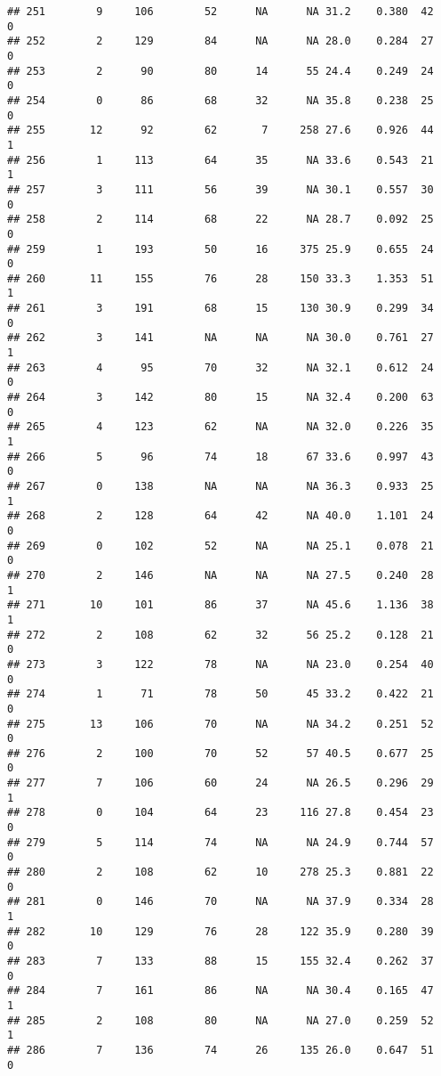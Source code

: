 \documentclass[
]{article}
\begin{document}
\begin{verbatim}
## 251        9     106        52      NA      NA 31.2    0.380  42    0
## 252        2     129        84      NA      NA 28.0    0.284  27    0
## 253        2      90        80      14      55 24.4    0.249  24    0
## 254        0      86        68      32      NA 35.8    0.238  25    0
## 255       12      92        62       7     258 27.6    0.926  44    1
## 256        1     113        64      35      NA 33.6    0.543  21    1
## 257        3     111        56      39      NA 30.1    0.557  30    0
## 258        2     114        68      22      NA 28.7    0.092  25    0
## 259        1     193        50      16     375 25.9    0.655  24    0
## 260       11     155        76      28     150 33.3    1.353  51    1
## 261        3     191        68      15     130 30.9    0.299  34    0
## 262        3     141        NA      NA      NA 30.0    0.761  27    1
## 263        4      95        70      32      NA 32.1    0.612  24    0
## 264        3     142        80      15      NA 32.4    0.200  63    0
## 265        4     123        62      NA      NA 32.0    0.226  35    1
## 266        5      96        74      18      67 33.6    0.997  43    0
## 267        0     138        NA      NA      NA 36.3    0.933  25    1
## 268        2     128        64      42      NA 40.0    1.101  24    0
## 269        0     102        52      NA      NA 25.1    0.078  21    0
## 270        2     146        NA      NA      NA 27.5    0.240  28    1
## 271       10     101        86      37      NA 45.6    1.136  38    1
## 272        2     108        62      32      56 25.2    0.128  21    0
## 273        3     122        78      NA      NA 23.0    0.254  40    0
## 274        1      71        78      50      45 33.2    0.422  21    0
## 275       13     106        70      NA      NA 34.2    0.251  52    0
## 276        2     100        70      52      57 40.5    0.677  25    0
## 277        7     106        60      24      NA 26.5    0.296  29    1
## 278        0     104        64      23     116 27.8    0.454  23    0
## 279        5     114        74      NA      NA 24.9    0.744  57    0
## 280        2     108        62      10     278 25.3    0.881  22    0
## 281        0     146        70      NA      NA 37.9    0.334  28    1
## 282       10     129        76      28     122 35.9    0.280  39    0
## 283        7     133        88      15     155 32.4    0.262  37    0
## 284        7     161        86      NA      NA 30.4    0.165  47    1
## 285        2     108        80      NA      NA 27.0    0.259  52    1
## 286        7     136        74      26     135 26.0    0.647  51    0

\end{verbatim}
\end{document}

